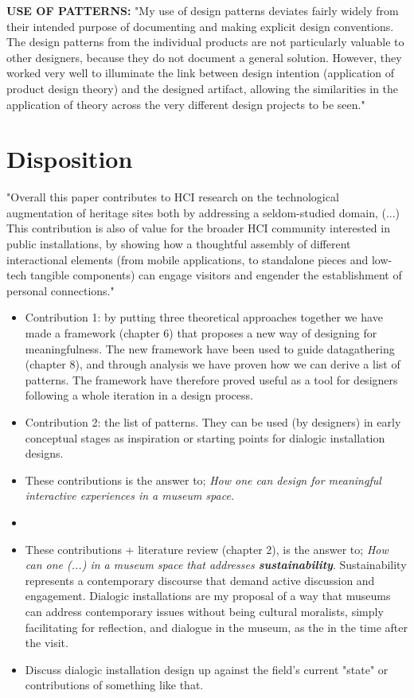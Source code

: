 \textbf{USE OF PATTERNS:} "My use of design patterns deviates fairly widely from their intended purpose of documenting and making explicit design conventions. The design patterns from the individual products are not particularly valuable to other designers, because they do not document a general solution. However, they worked very well to illuminate the link between design intention (application of product design theory) and the designed artifact, allowing the similarities in the application of theory across the very different design projects to be seen." \autocite[p. 402]{zimmerman_designing_2009}




\section{Disposition}

"Overall this paper contributes to HCI research on the technological augmentation of heritage sites both by addressing a seldom-studied domain, (...) This contribution is also of value for the broader HCI community interested in public installations, by showing how a thoughtful assembly of different interactional elements (from mobile applications, to standalone pieces and low-tech tangible components) can engage visitors and engender the establishment of personal connections." \autocite{ciolfi_designing_2012}


\begin{itemize}
    \item Contribution 1: by putting three theoretical approaches together we have made a framework (chapter 6) that proposes a new way of designing for meaningfulness. The new framework have been used to guide datagathering (chapter 8), and through analysis we have proven how we can derive a list of patterns. The framework have therefore proved useful as a tool for designers following a whole iteration in a design process.
    
    
    \item Contribution 2: the list of patterns. They can be used (by designers) in early conceptual stages as inspiration or starting points for dialogic installation designs. 
    \item These contributions is the answer to; \emph{How one can design for meaningful interactive experiences in a museum space.}
    \item
    
     \item These contributions + literature review (chapter 2), is the answer to; \emph{How can one (...) in a museum space that addresses \textbf{sustainability}}. Sustainability represents a contemporary discourse that demand active discussion and engagement. Dialogic installations are my proposal of a way that museums can address contemporary issues without being cultural moralists, simply facilitating for reflection, and dialogue in the museum, as the  in the time after the visit. 
    \item Discuss dialogic installation design up against the field's current "state" or contributions of something like that.

\end{itemize}


